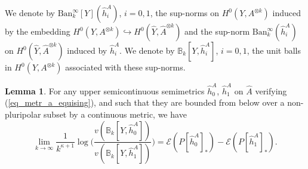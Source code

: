 \documentclass[12pt]{article}
\numberwithin{equation}{section}
\theoremstyle{theorem}
\theoremstyle{definition}
\newtheorem{lem}[thm]{Lemma}
\theoremstyle{remark}
\newcommand{\vol}{v}
\begin{document}
	\par 
	We denote by ${\textrm{Ban}}_k^{\infty}[Y](\widehat{h}^A_i)$, $i = 0, 1$, the sup-norms on $H^0(Y, A^{\otimes k})$ induced by the embedding $H^0(Y, A^{\otimes k}) \hookrightarrow H^0(\widehat{Y}, \widehat{A}^{\otimes k})$ and the sup-norm ${\textrm{Ban}}_k^{\infty}(\widehat{h}^A_i)$ on $H^0(\widehat{Y}, \widehat{A}^{\otimes k})$ induced by $\widehat{h}^A_i$.
	We denote by $\mathbb{B}_k[Y, \widehat{h}^A_i]$, $i = 0, 1$, the unit balls in $H^0(Y, A^{\otimes k})$ associated with these sup-norms.
	\begin{lem}\label{lem_bb_sing}
		For any upper semicontinuous semimetrics $\widehat{h}^A_0$, $\widehat{h}^A_1$ on $\widehat{A}$ verifying (\ref{eq_metr_a_equising}), and such that they are bounded from below over a non-pluripolar subset by a continuous metric, we have
		\begin{equation}\label{rem_thm_isom2}
			\lim_{k \to \infty}
			\frac{1}{k^{\kappa + 1}}
			\log\Big(
			\frac{\vol(\mathbb{B}_k[Y, \widehat{h}^A_0])}{\vol(\mathbb{B}_k[Y, \widehat{h}^A_1])}
			\Big)
			=
			\mathscr{E}(P[\widehat{h}^A_0]_*) - \mathscr{E}(P[\widehat{h}^A_1]_*).
		\end{equation}
	\end{lem}
\end{document}
